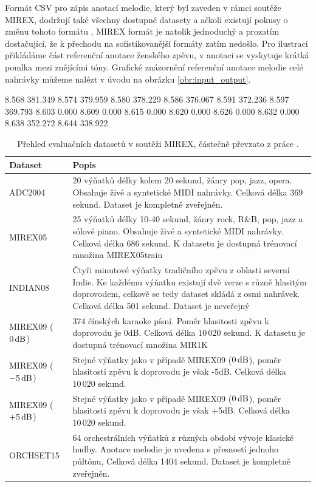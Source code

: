 Formát CSV pro zápis anotací melodie, který byl zaveden v rámci soutěže MIREX, dodržují také všechny dostupné datasety a ačkoli existují pokusy o změnu tohoto formátu \citep{Humphrey2014a}, MIREX formát je natolik jednoduchý a prozatím dostačující, že k přechodu na sofistikovanější formáty zatím nedošlo. Pro ilustraci přikládáme část referenční anotace ženského zpěvu, v anotaci se vyskytuje krátká pomlka mezi znějícími tóny. Grafické znázornění referenční anotace melodie celé nahrávky můžeme nalézt v úvodu na obrázku \ref{obr:input_output}.

\begin{code}[xrightmargin=20em]

8.568     381.349
8.574     379.959
8.580     378.229
8.586     376.067
8.591     372.236
8.597     369.793
8.603     0.000
8.609     0.000
8.615     0.000
8.620     0.000
8.626     0.000
8.632     0.000
8.638     352.272
8.644     338.922

\end{code}

\begin{table}[h!]
\centering
\begin{tabular}{p{2.5cm}p{11cm}}
\toprule
Dataset        & Popis \\
\midrule
ADC2004        & 20 výňatků délky kolem 20 sekund, žánry pop, jazz, opera. Obsahuje živé a syntetické MIDI nahrávky. Celková délka 369 sekund. Dataset je kompletně zveřejněn. \\
MIREX05        & 25 výňatků délky 10-40 sekund, žánry rock, R\&B, pop, jazz a sólové piano. Obsahuje živé a syntetické MIDI nahrávky. Celková délka 686 sekund. K datasetu je dostupná trénovací množina MIREX05train \\
INDIAN08       & Čtyři minutové výňatky tradičního zpěvu z oblasti severní Indie. Ke každému výňatku existují dvě verze s různě hlasitým doprovodem, celkově se tedy dataset skládá z osmi nahrávek. Celková délka 501 sekund. Dataset je neveřejný \\
MIREX09 ($0\,\rm dB$)  & 374 čínských karaoke písní. Poměr hlasitosti zpěvu k doprovodu je 0dB. Celková délka $10\,020$ sekund. K datasetu je dostupná trénovací množina MIR1K \\
MIREX09 ($-5\,\rm dB$) & Stejné výňatky jako v případě MIREX09 ($0\,\rm dB$), poměr hlasitosti zpěvu k doprovodu je však -5dB. Celková délka $10\,020$ sekund. \\
MIREX09 ($+5\,\rm dB$) & Stejné výňatky jako v případě MIREX09 ($0\,\rm dB$), poměr hlasitosti zpěvu k doprovodu je však +5dB. Celková délka $10\,020$ sekund. \\
ORCHSET15      & 64 orchestrálních výňatků z různých období vývoje klasické hudby. Anotace melodie je uvedena s přesností jednoho půltónu, Celková délka 1404 sekund. Dataset je kompletně zveřejněn. \\
\bottomrule
\end{tabular}
\caption{Přehled evaluačních datasetů v soutěži MIREX, částečně převzato z práce \cite{Salamon2014}.}\label{tab:mirex_datasety}
\end{table}

